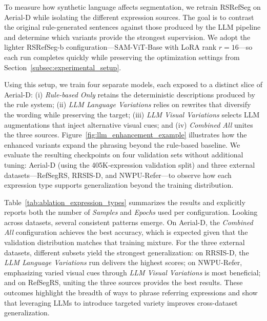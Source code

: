 \documentclass[journal]{IEEEtran}
\begin{document}
To measure how synthetic language affects segmentation, we retrain RSRefSeg on Aerial-D while isolating the different expression sources. The goal is to contrast the original rule-generated sentences against those produced by the LLM pipeline and determine which variants provide the strongest supervision. We adopt the lighter RSRefSeg-b configuration—SAM-ViT-Base with LoRA rank $r=16$—so each run completes quickly while preserving the optimization settings from Section~\ref{subsec:experimental_setup}.

Using this setup, we train four separate models, each exposed to a distinct slice of Aerial-D: (i) \emph{Rule-based Only} retains the deterministic descriptions produced by the rule system; (ii) \emph{LLM Language Variations} relies on rewrites that diversify the wording while preserving the target; (iii) \emph{LLM Visual Variations} selects LLM augmentations that inject alternative visual cues; and (iv) \emph{Combined All} unites the three sources. Figure~\ref{fig:llm_enhancement_example} illustrates how the enhanced variants expand the phrasing beyond the rule-based baseline. We evaluate the resulting checkpoints on four validation sets without additional tuning: Aerial-D (using the 405K-expression validation split) and three external datasets—RefSegRS, RRSIS-D, and NWPU-Refer—to observe how each expression type supports generalization beyond the training distribution.

Table~\ref{tab:ablation_expression_types} summarizes the results and explicitly reports both the number of \emph{Samples} and \emph{Epochs} used per configuration. Looking across datasets, several consistent patterns emerge. On Aerial-D, the \emph{Combined All} configuration achieves the best accuracy, which is expected given that the validation distribution matches that training mixture. For the three external datasets, different subsets yield the strongest generalization: on RRSIS-D, the \emph{LLM Language Variations} run delivers the highest scores; on NWPU-Refer, emphasizing varied visual cues through \emph{LLM Visual Variations} is most beneficial; and on RefSegRS, uniting the three sources provides the best results. These outcomes highlight the breadth of ways to phrase referring expressions and show that leveraging LLMs to introduce targeted variety improves cross-dataset generalization.
\end{document}
